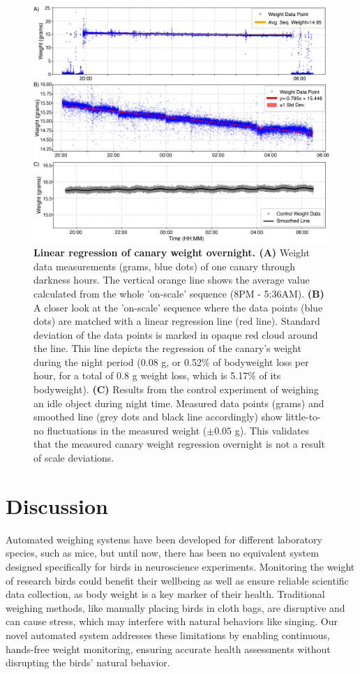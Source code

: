 \documentclass{article}
\begin{document}
\begin{figure}
    \centering
    \includegraphics[width=1\linewidth]{Figures/Regression_Overnight.png}
    \caption{\textbf{Linear regression of canary weight overnight. (A)} Weight data measurements (grams, blue dots) of one canary through darkness hours. The vertical orange line shows the average value calculated from the whole 'on-scale' sequence (8PM - 5:36AM). \textbf{(B)} A closer look at the 'on-scale' sequence where the data points (blue dots) are matched with a linear regression line (red line). Standard deviation of the data points is marked in opaque red cloud around the line. This line depicts the regression of the canary's weight during the night period (0.08 g, or 0.52\% of bodyweight loss per hour, for a total of 0.8 g weight loss, which is 5.17\% of its bodyweight). \textbf{(C)} Results from the control experiment of weighing an idle object during night time. Measured data points (grams) and smoothed line (grey dots and black line accordingly) show little-to-no fluctuations in the measured weight ($\pm0.05$ g). This validates that the measured canary weight regression overnight is not a result of scale deviations. }
    \label{fig:Regression}
\end{figure}


\section{Discussion} \label{sec:discussion}

Automated weighing systems have been developed for different laboratory species, such as mice, but until now, there has been no equivalent system designed specifically for birds in neuroscience experiments. Monitoring the weight of research birds could benefit their wellbeing as well as ensure reliable scientific data collection, as body weight is a key marker of their health\cite{morton1985guidelines}. Traditional weighing methods, like manually placing birds in cloth bags\cite{Erkenswick_2023}, are disruptive and can cause stress, which may interfere with natural behaviors like singing. Our novel automated system addresses these limitations by enabling continuous, hands-free weight monitoring, ensuring accurate health assessments without disrupting the birds' natural behavior.
\end{document}
